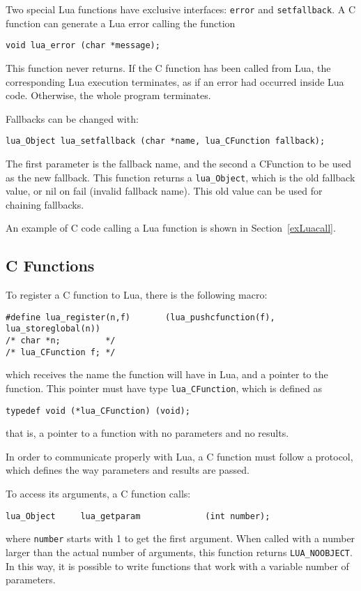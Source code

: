 Two special Lua functions have exclusive interfaces:
\verb'error' and \verb'setfallback'.
A C function can generate a Lua error calling the function
\begin{verbatim}
void lua_error (char *message);
\end{verbatim}
This function never returns.
If the C function has been called from Lua,
the corresponding Lua execution terminates,
as if an error had occurred inside Lua code.
Otherwise, the whole program terminates.

Fallbacks can be changed with:
\begin{verbatim}
lua_Object lua_setfallback (char *name, lua_CFunction fallback);
\end{verbatim}
The first parameter is the fallback name,
and the second a CFunction to be used as the new fallback.
This function returns a \verb'lua_Object',
which is the old fallback value,
or nil on fail (invalid fallback name).
This old value can be used for chaining fallbacks.

An example of C code calling a Lua function is shown in
Section~\ref{exLuacall}.


\subsection{C Functions} \label{LuacallC}
To register a C function to Lua,
there is the following macro:
\begin{verbatim}
#define lua_register(n,f)       (lua_pushcfunction(f), lua_storeglobal(n))
/* char *n;         */
/* lua_CFunction f; */
\end{verbatim}
which receives the name the function will have in Lua,
and a pointer to the function.
This pointer must have type \verb'lua_CFunction',
which is defined as
\begin{verbatim}
typedef void (*lua_CFunction) (void);
\end{verbatim}
that is, a pointer to a function with no parameters and no results.

In order to communicate properly with Lua,
a C function must follow a protocol,
which defines the way parameters and results are passed.

To access its arguments, a C function calls:
\begin{verbatim}
lua_Object     lua_getparam             (int number);
\end{verbatim}
where \verb'number' starts with 1 to get the first argument.
When called with a number larger than the actual number of arguments,
this function returns
\verb'LUA_NOOBJECT'.
In this way, it is possible to write functions that work with
a variable number of parameters.

